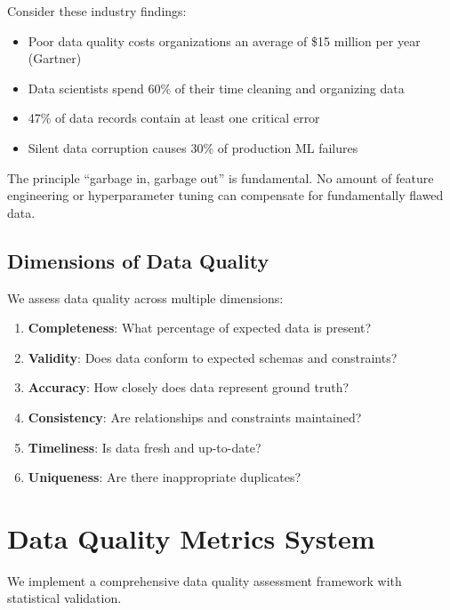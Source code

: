 Consider these industry findings:

\begin{itemize}
    \item Poor data quality costs organizations an average of \$15 million per year (Gartner)
    \item Data scientists spend 60\% of their time cleaning and organizing data
    \item 47\% of data records contain at least one critical error
    \item Silent data corruption causes 30\% of production ML failures
\end{itemize}

The principle ``garbage in, garbage out'' is fundamental. No amount of feature engineering or hyperparameter tuning can compensate for fundamentally flawed data.

\subsection{Dimensions of Data Quality}

We assess data quality across multiple dimensions:

\begin{enumerate}
    \item \textbf{Completeness}: What percentage of expected data is present?
    \item \textbf{Validity}: Does data conform to expected schemas and constraints?
    \item \textbf{Accuracy}: How closely does data represent ground truth?
    \item \textbf{Consistency}: Are relationships and constraints maintained?
    \item \textbf{Timeliness}: Is data fresh and up-to-date?
    \item \textbf{Uniqueness}: Are there inappropriate duplicates?
\end{enumerate}

\section{Data Quality Metrics System}

We implement a comprehensive data quality assessment framework with statistical validation.

